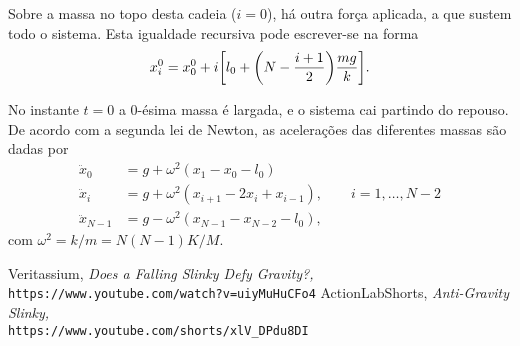 \documentclass{article}
\begin{document}
\vspace{0.75em}
\noindent
Sobre a massa no topo desta cadeia ($i=0$), há outra força aplicada, a que
sustem todo o sistema. Esta igualdade recursiva pode escrever-se na forma
\begin{equation}
  x^0_i = x^0_0 + i\qty[l_0 + \qty(N-\frac{i+1}{2})\frac{mg}{k}].
\end{equation}

No instante $t=0$ a 0-ésima massa é largada, e o sistema cai partindo do
repouso. De acordo com a segunda lei de Newton, as acelerações das diferentes
massas são dadas por
\begin{equation}
  \begin{aligned}
    \ddot x_0     &= g + \omega^2 (x_1-x_0-l_0)\\
    \ddot x_i     &= g + \omega^2 
      (x_{i+1}-2x_i+x_{i-1}),\qquad i=1, \ldots, N-2\\
    \ddot x_{N-1} &= g - \omega^2 (x_{N-1}-x_{N-2}-l_0),
  \end{aligned}
\end{equation}
com $\omega^2=k/m=N(N-1)K/M$.



\begin{thebibliography}{100}
   Veritassium, 
    \textsl{Does a Falling Slinky Defy Gravity?,}\\
    \texttt{https://www.youtube.com/watch?v=uiyMuHuCFo4}
      ActionLabShorts,
      \textsl{Anti-Gravity Slinky,}\\
      \texttt{https://www.youtube.com/shorts/xlV\_DPdu8DI}
\end{thebibliography}
\end{document}

